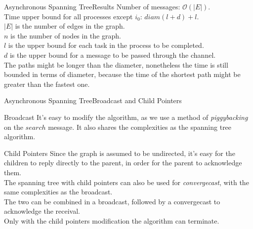 \documentclass[pdf]{beamer}
\begin{document}
\begin{frame}{Asynchronous Spanning Tree}{Results}
    Number of messages: $\mathcal{O}(|E|)$.\\
    Time upper bound for all processes except $i_0$: $diam(l+d)+l$.\\
    \vspace{6pt}
    $|E|$ is the number of edges in the graph.\\
    $n$ is the number of nodes in the graph.\\
    $l$ is the upper bound for each task in the process to be completed.\\
    $d$ is the upper bound for a message to be passed through the channel.\\
    \pause
    \vspace{6pt}
    The paths might be longer than the diameter, nonetheless the time is still bounded in 
    terms of diameter, because the time of the shortest path might be greater than the 
    fastest one.
\end{frame}

\begin{frame}{Asynchronous Spanning Tree}{Broadcast and Child Pointers}
    \begin{block}{Broadcast}
        It's easy to modify the algorithm, as we use a method of \emph{piggybacking} on the
        $search$ message. It also shares the complexities as the spanning tree algorithm.
    \end{block}
    \begin{block}{Child Pointers}
        Since the graph is assumed to be undirected, it's easy for the children to reply
        directly to the parent, in order for the parent to acknowledge them.\\
        The spanning tree with child pointers can also be used for \emph{convergecast}, with the same complexities as the broadcast.\\
        The two can be combined in a broadcast, followed by a convergecast to acknowledge the receival.\\
        Only with the child pointers modification the algorithm can terminate.
    \end{block}
\end{frame}
\end{document}
